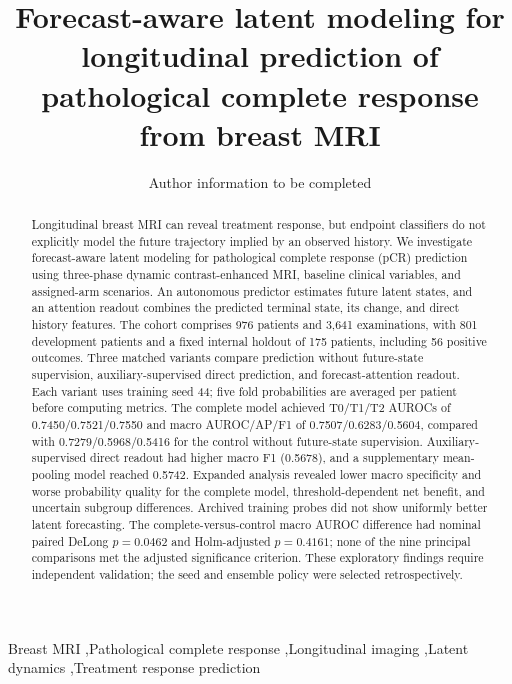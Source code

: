\documentclass[5p,twocolumn,authoryear]{elsarticle}
\begin{document}
\begin{frontmatter}
\title{Forecast-aware latent modeling for longitudinal prediction of pathological complete response from breast MRI}
\author{Author information to be completed}
\address{Affiliations and corresponding author to be completed}
\begin{abstract}
Longitudinal breast MRI can reveal treatment response, but endpoint classifiers do not explicitly model the future trajectory implied by an observed history. We investigate forecast-aware latent modeling for pathological complete response (pCR) prediction using three-phase dynamic contrast-enhanced MRI, baseline clinical variables, and assigned-arm scenarios. An autonomous predictor estimates future latent states, and an attention readout combines the predicted terminal state, its change, and direct history features. The cohort comprises 976 patients and 3,641 examinations, with 801 development patients and a fixed internal holdout of 175 patients, including 56 positive outcomes. Three matched variants compare prediction without future-state supervision, auxiliary-supervised direct prediction, and forecast-attention readout. Each variant uses training seed 44; five fold probabilities are averaged per patient before computing metrics. The complete model achieved T0/T1/T2 AUROCs of 0.7450/0.7521/0.7550 and macro AUROC/AP/F1 of 0.7507/0.6283/0.5604, compared with 0.7279/0.5968/0.5416 for the control without future-state supervision. Auxiliary-supervised direct readout had higher macro F1 (0.5678), and a supplementary mean-pooling model reached 0.5742. Expanded analysis revealed lower macro specificity and worse probability quality for the complete model, threshold-dependent net benefit, and uncertain subgroup differences. Archived training probes did not show uniformly better latent forecasting. The complete-versus-control macro AUROC difference had nominal paired DeLong $p=0.0462$ and Holm-adjusted $p=0.4161$; none of the nine principal comparisons met the adjusted significance criterion. These exploratory findings require independent validation; the seed and ensemble policy were selected retrospectively.
\end{abstract}
\begin{keyword}
Breast MRI \sep Pathological complete response \sep Longitudinal imaging \sep Latent dynamics \sep Treatment response prediction
\end{keyword}
\end{frontmatter}








\end{document}

